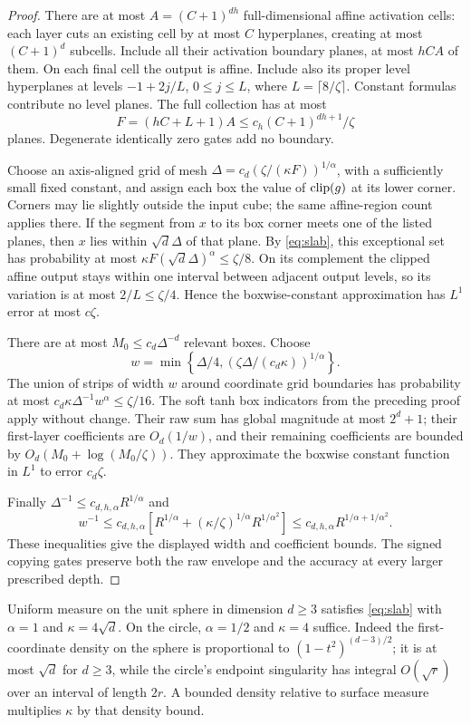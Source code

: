 \begin{proof}
There are at most $A=(C+1)^{dh}$ full-dimensional affine activation
cells: each layer cuts an existing cell by at most $C$ hyperplanes,
creating at most $(C+1)^d$ subcells. Include all their activation
boundary planes, at most $hCA$ of them. On each final cell the output
is affine. Include also its proper level hyperplanes at levels
$-1+2j/L$, $0\le j\le L$, where $L=\lceil8/\zeta\rceil$.
Constant formulas contribute no level planes. The full collection has
at most
\[
 F=(hC+L+1)A\le c_h(C+1)^{dh+1}/\zeta
\]
planes. Degenerate identically zero gates add no boundary.

Choose an axis-aligned grid of mesh
$\Delta=c_d(\zeta/(\kappa F))^{1/\alpha}$, with a sufficiently
small fixed constant, and assign each box the value of $\operatorname{clip}(g)$ at
its lower corner. Corners may lie slightly outside the input cube;
the same affine-region count applies there. If the segment from $x$
to its box corner meets one of the listed planes, then $x$ lies within
$\sqrt d\Delta$ of that plane. By \eqref{eq:slab}, this exceptional
set has probability at most $\kappa F(\sqrt d\Delta)^\alpha\le\zeta/8$.
On its complement the clipped affine output stays within one interval
between adjacent output levels, so its variation is at most
$2/L\le\zeta/4$. Hence the boxwise-constant approximation has $L^1$
error at most $c\zeta$.

There are at most $M_0\le c_d\Delta^{-d}$ relevant boxes. Choose
\[
 w=\min\left\{\Delta/4,
       (\zeta\Delta/(c_d\kappa))^{1/\alpha}\right\}.
\]
The union of strips of width $w$ around coordinate grid boundaries
has probability at most $c_d\kappa\Delta^{-1}w^\alpha\le\zeta/16$.
The soft tanh box indicators from the preceding proof apply without
change. Their raw sum has global magnitude at most $2^d+1$;
their first-layer coefficients are $O_d(1/w)$, and their remaining
coefficients are bounded by
$O_d(M_0+\log(M_0/\zeta))$. They approximate the boxwise constant
function in $L^1$ to error $c_d\zeta$.

Finally $\Delta^{-1}\le c_{d,h,\alpha}R^{1/\alpha}$ and
\[
 w^{-1}\le c_{d,h,\alpha}
       \left[R^{1/\alpha}
              +(\kappa/\zeta)^{1/\alpha}R^{1/\alpha^2}\right]
 \le c_{d,h,\alpha}R^{1/\alpha+1/\alpha^2}.
\]
These inequalities give the displayed width and coefficient bounds.
The signed copying gates preserve both the raw envelope and the
accuracy at every larger prescribed depth.
\end{proof}

Uniform measure on the unit sphere in dimension $d\ge3$ satisfies
\eqref{eq:slab} with $\alpha=1$ and $\kappa=4\sqrt d$. On the circle,
$\alpha=1/2$ and $\kappa=4$ suffice. Indeed the first-coordinate density
on the sphere is proportional to $(1-t^2)^{(d-3)/2}$; it is at most
$\sqrt d$ for $d\ge3$, while the circle's endpoint singularity has
integral $O(\sqrt r)$ over an interval of length $2r$. A bounded density
relative to surface measure multiplies $\kappa$ by that density bound.
